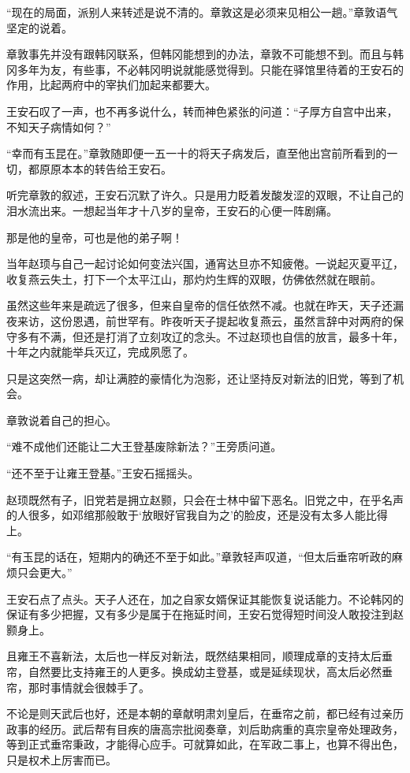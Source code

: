 “现在的局面，派别人来转述是说不清的。章敦这是必须来见相公一趟。”章敦语气坚定的说着。

章敦事先并没有跟韩冈联系，但韩冈能想到的办法，章敦不可能想不到。而且与韩冈多年为友，有些事，不必韩冈明说就能感觉得到。只能在驿馆里待着的王安石的作用，比起两府中的宰执们加起来都要大。

王安石叹了一声，也不再多说什么，转而神色紧张的问道：“子厚方自宫中出来，不知天子病情如何？”

“幸而有玉昆在。”章敦随即便一五一十的将天子病发后，直至他出宫前所看到的一切，都原原本本的转告给王安石。

听完章敦的叙述，王安石沉默了许久。只是用力眨着发酸发涩的双眼，不让自己的泪水流出来。一想起当年才十八岁的皇帝，王安石的心便一阵剧痛。

那是他的皇帝，可也是他的弟子啊！

当年赵顼与自己一起讨论如何变法兴国，通宵达旦亦不知疲倦。一说起灭夏平辽，收复燕云失土，打下一个太平江山，那灼灼生辉的双眼，仿佛依然就在眼前。

虽然这些年来是疏远了很多，但来自皇帝的信任依然不减。也就在昨天，天子还漏夜来访，这份恩遇，前世罕有。昨夜听天子提起收复燕云，虽然言辞中对两府的保守多有不满，但还是打消了立刻攻辽的念头。不过赵顼也自信的放言，最多十年，十年之内就能举兵灭辽，完成夙愿了。

只是这突然一病，却让满腔的豪情化为泡影，还让坚持反对新法的旧党，等到了机会。

章敦说着自己的担心。

“难不成他们还能让二大王登基废除新法？”王旁质问道。

“还不至于让雍王登基。”王安石摇摇头。

赵顼既然有子，旧党若是拥立赵颢，只会在士林中留下恶名。旧党之中，在乎名声的人很多，如邓绾那般敢于‘放眼好官我自为之’的脸皮，还是没有太多人能比得上。

“有玉昆的话在，短期内的确还不至于如此。”章敦轻声叹道，“但太后垂帘听政的麻烦只会更大。”

王安石点了点头。天子人还在，加之自家女婿保证其能恢复说话能力。不论韩冈的保证有多少把握，又有多少是属于在拖延时间，王安石觉得短时间没人敢投注到赵颢身上。

且雍王不喜新法，太后也一样反对新法，既然结果相同，顺理成章的支持太后垂帘，自然要比支持雍王的人更多。换成幼主登基，或是延续现状，高太后必然垂帘，那时事情就会很棘手了。

不论是则天武后也好，还是本朝的章献明肃刘皇后，在垂帘之前，都已经有过亲历政事的经历。武后帮有目疾的唐高宗批阅奏章，刘后助病重的真宗皇帝处理政务，等到正式垂帘秉政，才能得心应手。可就算如此，在军政二事上，也算不得出色，只是权术上厉害而已。

